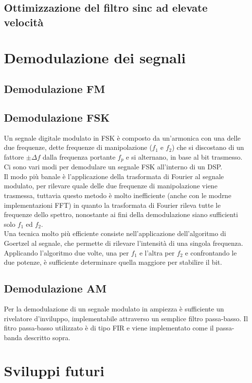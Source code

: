 \documentclass{article}
\begin{document}
\subsection{Ottimizzazione del filtro sinc ad elevate velocità}


\section{Demodulazione dei segnali}

\subsection{Demodulazione FM}
\subsection{Demodulazione FSK}
Un segnale digitale modulato in FSK è composto da un'armonica con una delle due frequenze, dette frequenze di manipolazione
($f_1$ e $f_2$) che si discostano di un fattore $\pm \Delta f$ dalla frequenza portante $f_p$ e si alternano, in base al bit
trasmesso. Ci sono vari modi per demodulare un segnale FSK all'interno di un DSP.\\
Il modo più banale è l'applicazione della trasformata di Fourier al segnale modulato, per rilevare quale delle due frequenze
di manipolazione viene trasmessa, tuttavia questo metodo è molto inefficiente (anche con le modrne implementazioni FFT) in quanto
la trasformata di Fourier rileva tutte le frequenze dello spettro, nonostante ai fini della demodulazione siano sufficienti
solo $f_1$ ed $f_2$.\\
Una tecnica molto più efficiente consiste nell'applicazione dell'algoritmo di Goertzel al segnale, che permette di rilevare
l'intensità di una singola frequenza. Applicando l'algoritmo due volte, una per $f_1$ e l'altra per $f_2$ e confrontando le due
potenze, è sufficiente determinare quella maggiore per stabilire il bit.

\subsection{Demodulazione AM}
Per la demodulazione di un segnale modulato in ampiezza è sufficiente un rivelatore d'inviluppo, implementabile attraverso un semplice
filtro passa-basso. Il fitro passa-basso utilizzato è di tipo FIR e viene implementato come il passa-banda descritto sopra.

\section{Sviluppi futuri}
\end{document}
